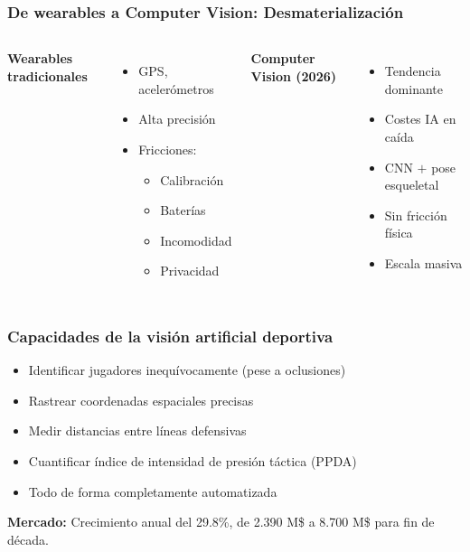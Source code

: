 \documentclass[aspectratio=169]{beamer}
\begin{document}
\begin{frame}\frametitle{De wearables a Computer Vision: Desmaterialización}
\begin{columns}[T]
\textbf{Wearables tradicionales}
\begin{itemize}
    \item GPS, acelerómetros
    \item Alta precisión
    \item Fricciones:
    \begin{itemize}
        \item Calibración
        \item Baterías
        \item Incomodidad
        \item Privacidad
    \end{itemize}
\end{itemize}

\textbf{Computer Vision (2026)}
\begin{itemize}
    \item Tendencia dominante
    \item Costes IA en caída
    \item CNN $+$ pose esqueletal
    \item Sin fricción física
    \item Escala masiva
\end{itemize}
\end{columns}
\end{frame}

\begin{frame}\frametitle{Capacidades de la visión artificial deportiva}
\begin{itemize}
    \item Identificar jugadores inequívocamente (pese a oclusiones)
    \item Rastrear coordenadas espaciales precisas
    \item Medir distancias entre líneas defensivas
    \item Cuantificar índice de intensidad de presión táctica (PPDA)
    \item Todo de forma completamente automatizada
\end{itemize}
\textbf{Mercado:} Crecimiento anual del 29.8\%, de 2.390 M\$ a 8.700 M\$ para fin de década.
\end{frame}
\end{document}
